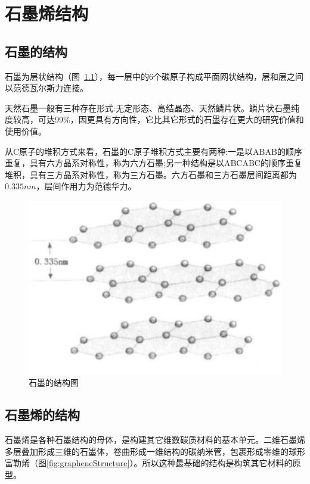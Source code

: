
\chapter{石墨烯结构}

\section{石墨的结构}
石墨为层状结构（图~\ref{fig:graphiteStructure}），每一层中的6个碳原子构成平面网状结构，层和层之间以范德瓦尔斯力连接。

天然石墨一般有三种存在形式:无定形态、高结晶态、天然鳞片状。鳞片状石墨纯度较高，可达99\%，因更具有方向性，它比其它形式的石墨存在更大的研究价值和使用价值。

从C原子的堆积方式来看，石墨的C原子堆积方式主要有两种:一是以ABAB的顺序重复，具有六方晶系对称性，称为六方石墨;另一种结构是以ABCABC的顺序重复堆积，具有三方晶系对称性，称为三方石墨。六方石墨和三方石墨层间距离都为$0.335nm$，层间作用力为范德华力。

{\begin{figure}
    \centering
    \includegraphics[scale=0.6]{img/石墨的结构图.png}
    \caption{石墨的结构图}
    \label{fig:graphiteStructure}
\end{figure}}

\section{石墨烯的结构}
石墨烯是各种石墨结构的母体，是构建其它维数碳质材料的基本单元。二维石墨烯多层叠加形成三维的石墨体，卷曲形成一维结构的碳纳米管，包裹形成零维的球形富勒烯（图\ref{fig:grapheneStructure}）。所以这种最基础的结构是构筑其它材料的原型。

